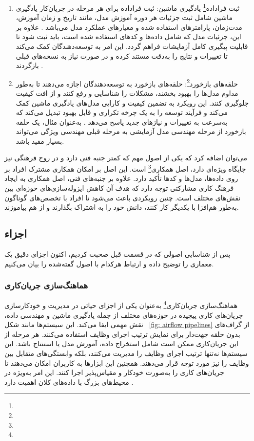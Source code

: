 \begin{enumerate}
	\item 
	ثبت فراداده\footnote{} یادگیری ماشین:
	ثبت فراداده برای هر مرحله در جریان‌کار یادگیری ماشین شامل ثبت جزئیات هر دوره آموزش مدل، مانند تاریخ و زمان آموزش، مدت‌زمان، پارامترهای استفاده شده و معیارهای عملکرد مدل می‌باشد \cite{MLOpsWO2}. علاوه بر این، جزئیات مدل که شامل داده‌ها و کدهای استفاده شده است، باید ثبت شود تا قابلیت پیگیری کامل آزمایشات فراهم گردد. این امر به توسعه‌دهندگان کمک می‌کند تا تغییرات و نتایج را به‌دقت مستند کرده و در صورت نیاز به نسخه‌های قبلی بازگردند \cite{MLOpsProd2}.
	\item 
	حلقه‌های بازخورد\footnote{}:
	حلقه‌های بازخورد به توسعه‌دهندگان اجازه می‌دهند تا به‌طور مداوم مدل‌ها را بهبود بخشند، مشکلات را شناسایی و رفع کنند و از افت کیفیت جلوگیری کنند. این رویکرد به تضمین کیفیت و کارایی مدل‌های یادگیری ماشین کمک می‌کند و فرآیند توسعه را به یک چرخه تکراری و قابل بهبود تبدیل می‌کند که به‌سرعت به تغییرات و نیازهای جدید پاسخ می‌دهد \cite{MLOpsProd2}. به‌عنوان مثال، یک حلقه بازخورد از مرحله مهندسی مدل آزمایشی به مرحله قبلی مهندسی ویژگی می‌تواند بسیار مفید باشد.
\end{enumerate}

می‌توان اضافه کرد که یکی از اصول مهم که کمتر جنبه فنی دارد و در روح فرهنگی  نیز جایگاه ویژه‌ای دارد، اصل همکاری\footnote{} است. این اصل بر امکان همکاری مشترک افراد بر روی داده‌ها، مدل‌ها و کدها تأکید دارد. علاوه بر جنبه‌های فنی، اصل همکاری به ایجاد فرهنگ کاری مشارکتی توجه دارد که هدف آن کاهش ایزوله‌سازی‌های حوزه‌ای بین نقش‌های مختلف است. چنین رویکردی باعث می‌شود تا افراد با تخصص‌های گوناگون به‌طور هم‌افزا با یکدیگر کار کنند، دانش خود را به اشتراک بگذارند و از هم بیاموزند.


\subsection{اجزاء}

پس از شناسایی اصولی که در قسمت قبل صحبت کردیم، اکنون اجزای دقیق یک معماری  را توضیح داده و ارتباط هرکدام با اصول گفته‌شده را بیان می‌کنیم.

\subsubsection{هماهنگ‌سازی جریان‌کاری}
هماهنگ‌سازی جریان‌کاری\footnote{} به‌عنوان یکی از اجزای حیاتی در مدیریت و خودکارسازی جریان‌های کاری پیچیده در حوزه‌های مختلف از جمله یادگیری ماشین و مهندسی داده، نقش مهمی ایفا می‌کند. این سیستم‌ها مانند شکل 
~\ref{fig: airflow pipelines}
از گراف‌های بدون حلقه جهت‌دار برای نمایش ترتیب اجرای وظایف استفاده می‌کنند. هر مرحله از این جریان‌کاری ممکن است شامل استخراج داده، آموزش مدل یا استنتاج باشد. این سیستم‌ها نه‌تنها ترتیب اجرای وظایف را مدیریت می‌کنند، بلکه وابستگی‌های متقابل بین وظایف را نیز مورد توجه قرار می‌دهند. همچنین این ابزارها به کاربران امکان می‌دهند تا جریان‌های کاری را به‌صورت خودکار و مقیاس‌پذیر اجرا کنند. این امر به‌ویژه در محیط‌های بزرگ با داده‌های کلان اهمیت دارد \cite{MLOpsWO2}.

